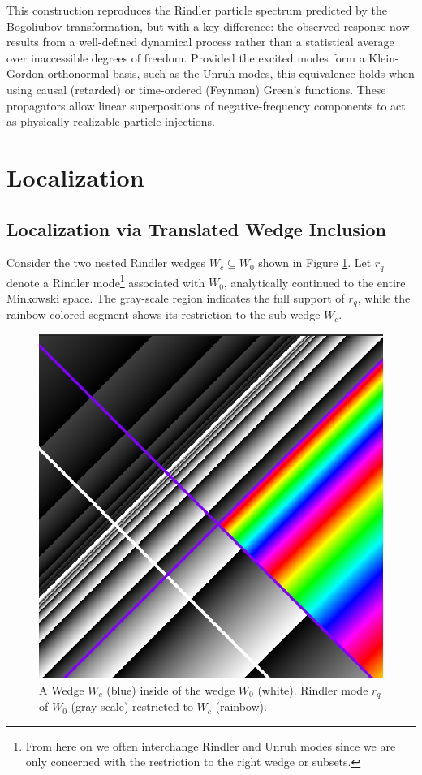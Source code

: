 \documentclass[12pt,a4paper]{article}
\begin{document}
This construction reproduces the Rindler particle spectrum predicted by the Bogoliubov transformation, but with a key difference: the observed response now results from a well-defined dynamical process rather than a statistical average over inaccessible degrees of freedom. Provided the excited modes form a Klein-Gordon orthonormal basis, such as the Unruh modes, this equivalence holds when using causal (retarded) or time-ordered (Feynman) Green’s functions. These propagators allow linear superpositions of negative-frequency components to act as physically realizable particle injections.

\section{Localization}
\subsection{Localization via Translated Wedge Inclusion}

Consider the two nested Rindler wedges $W_c \subseteq W_0$ shown in Figure \ref{restrict}. Let $r_q$ denote a Rindler mode\footnote{From here on we often interchange Rindler and Unruh modes since we are only concerned with the restriction to the right wedge or subsets.} associated with $W_0$, analytically continued to the entire Minkowski space. The gray-scale region indicates the full support of $r_q$, while the rainbow-colored segment shows its restriction to the sub-wedge $W_c$.

\begin{figure}[h]
  \centering
\includegraphics[scale=0.4]{wedge_in_wedge.png}
\caption{A Wedge $W_c$ (blue) inside of the wedge $W_0$ (white). Rindler mode $r_q$ of $W_0$ (gray-scale) restricted to $W_c$ (rainbow).}
\label{restrict}
\end{figure}
\end{document}
